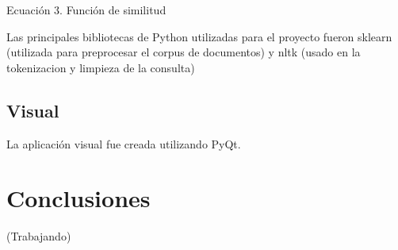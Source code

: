 \documentclass[runningheads]{llncs}
\begin{document}
Ecuación 3. Función de similitud




Las principales bibliotecas de Python utilizadas para el proyecto fueron sklearn (utilizada para preprocesar el corpus de documentos) y nltk (usado en la tokenizacion y limpieza de la consulta)

\subsection*{Visual}
La aplicación visual fue creada utilizando PyQt.

\section*{Conclusiones}
(Trabajando)
\end{document}
